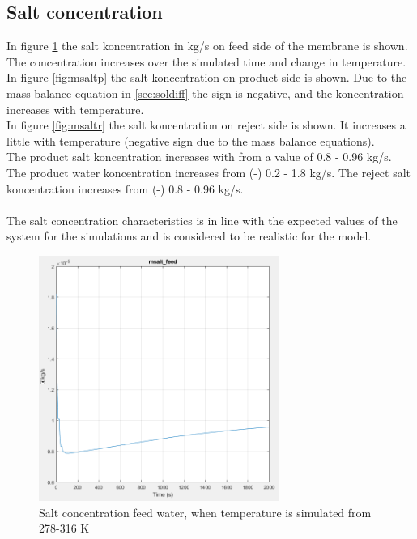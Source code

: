 \subsection{Salt concentration}
In figure \ref{fig:msaltf} the salt koncentration in kg/s on feed side of the membrane is shown. The concentration increases over the simulated time and change in temperature. \\
In figure \ref{fig:msaltp} the salt koncentration on product side is shown. Due to the mass balance equation in \ref{sec:soldiff} the sign is negative, and the koncentration increases with temperature.\\
In figure \ref{fig:msaltr} the salt koncentration on reject side is shown. It increases a little with temperature (negative sign due to the mass balance equations).\\
The product salt koncentration increases with from a value of  0.8 - 0.96 kg/s. The product water koncentration increases from (-) 0.2 - 1.8 kg/s. The reject salt koncentration increases from (-) 0.8 - 0.96 kg/s.\\
\\
The salt concentration characteristics is in line with the expected values of the system for the simulations and is considered to be realistic for the model. 
\begin{figure}[h]
\centering
    \includegraphics[width=0.7\textwidth]{msalt_feed.PNG}
    \caption{Salt concentration feed water, when temperature is simulated from 278-316 K}
    \label{fig:msaltf}
\end{figure}

